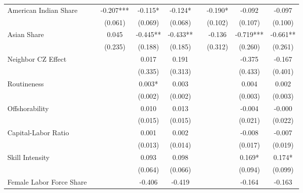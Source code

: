 \begin{table}[htbp]
\begin{tabular}{l*{8}{c}}
\addlinespace
American Indian Share&            &   -0.207***&   -0.115*  &   -0.124*  &            &   -0.190*  &   -0.092   &   -0.097   \\
                    &            &  (0.061)   &  (0.069)   &  (0.068)   &            &  (0.102)   &  (0.107)   &  (0.100)   \\
\addlinespace
Asian Share         &            &    0.045   &   -0.445** &   -0.433** &            &   -0.136   &   -0.719***&   -0.661** \\
                    &            &  (0.235)   &  (0.188)   &  (0.185)   &            &  (0.312)   &  (0.260)   &  (0.261)   \\
\addlinespace
Neighbor CZ Effect  &            &            &    0.017   &    0.191   &            &            &   -0.375   &   -0.167   \\
                    &            &            &  (0.335)   &  (0.313)   &            &            &  (0.433)   &  (0.401)   \\
\addlinespace
Routineness         &            &            &    0.003*  &    0.003   &            &            &    0.004   &    0.002   \\
                    &            &            &  (0.002)   &  (0.002)   &            &            &  (0.003)   &  (0.003)   \\
\addlinespace
Offshorability      &            &            &    0.010   &    0.013   &            &            &   -0.004   &   -0.000   \\
                    &            &            &  (0.015)   &  (0.015)   &            &            &  (0.021)   &  (0.022)   \\
\addlinespace
Capital-Labor Ratio &            &            &    0.001   &    0.002   &            &            &   -0.008   &   -0.007   \\
                    &            &            &  (0.013)   &  (0.014)   &            &            &  (0.017)   &  (0.019)   \\
\addlinespace
Skill Intensity     &            &            &    0.093   &    0.098   &            &            &    0.169*  &    0.174*  \\
                    &            &            &  (0.064)   &  (0.066)   &            &            &  (0.094)   &  (0.099)   \\
\addlinespace
Female Labor Force Share&            &            &   -0.406   &   -0.419   &            &            &   -0.164   &   -0.163   \\

\end{tabular}
\end{table}

